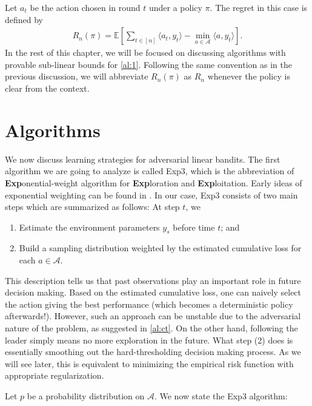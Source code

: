 \documentclass[letterpaper,11pt,openright,openany]{book}
\numberwithin{equation}{section}
\theoremstyle{plain}
\theoremstyle{definition}
\def\E{{\mathbb E}}
\begin{document}
Let $a_t$ be the action chosen in round $t$ under a policy $\pi$. The regret in this case is defined by 
\begin{align}
R_n(\pi) = \E\left[\sum_{t\in [n]}\langle a_t, y_t\rangle-\min_{a\in\mathcal A}\langle a, y_t\rangle\right].\label{al:1}
\end{align}
In the rest of this chapter, we will be focused on discussing algorithms with provable sub-linear bounds for \eqref{al:1}. Following the same convention as in the previous discussion, we will abbreviate $R_n(\pi)$ as $R_n$ whenever the policy is clear from the context. 


\section{Algorithms}

We now discuss learning strategies for adversarial linear bandits.
The first algorithm we are going to analyze is called Exp3, which is the abbreviation of \textbf{Exp}onential-weight algorithm for \textbf{Exp}loration and \textbf{Exp}loitation. 
Early ideas of exponential weighting can be found in \cite{Littlestone_1989, Vovk_1990}.
In our case, Exp3 consists of two main steps which are summarized as follows: At step $t$, we
\begin{enumerate}
\item Estimate the environment parameters $y_s$ before time $t$; and 
\item Build a sampling distribution weighted by the estimated cumulative loss for each $a\in\mathcal A$. 
\end{enumerate}
This description tells us that past observations play an important role in future decision making. Based on the estimated cumulative loss, one can naively select the action giving the best performance (which becomes a deterministic policy afterwards!). However, such an approach can be unstable due to the adversarial nature of the problem, as suggested in \eqref{al:ct}. On the other hand, following the leader simply means no more exploration in the future. What step (2) does is essentially smoothing out the hard-thresholding decision making process. As we will see later, this is equivalent to minimizing the empirical risk function with appropriate regularization.  

Let $p$ be a probability distribution on $\mathcal A$. We now state the Exp3 algorithm:
\end{document}
